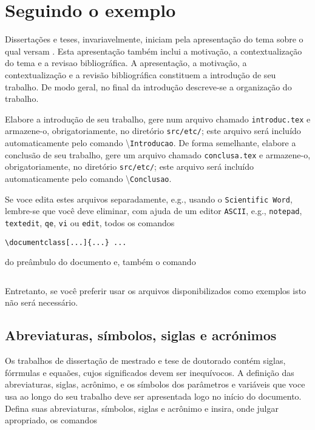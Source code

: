 
\chapter{Seguindo o exemplo\label{cap2}}

Dissertações e teses, invariavelmente, iniciam pela
apresentação do tema sobre o qual versam \cite{SP}. Esta
apresentação também inclui a motivação, a
contextualização do tema e a revisao bibliográfica. A
apresentação, a motivação, a contextualização e a
revisão bibliográfica constituem a introdução de seu trabalho.
De modo geral, no final da introdução descreve-se a
organização do trabalho.

Elabore a introdução de seu trabalho, gere num
arquivo chamado \texttt{introduc.tex} e armazene-o, obrigatoriamente, no diretório \texttt{src/etc/}; este arquivo será incluído automaticamente pelo comando \textbackslash\texttt{Introducao}. De forma semelhante, elabore a conclusão de seu trabalho, gere um arquivo chamado \texttt{conclusa.tex} e armazene-o, obrigatoriamente, no diretório \texttt{src/etc/}; este arquivo será incluído automaticamente pelo comando \textbackslash\texttt{Conclusao}. 

Se voce edita estes arquivos separadamente, e.g., usando o \texttt{Scientific Word}, lembre-se que você deve eliminar, com ajuda de um editor \texttt{ASCII},
e.g., \texttt{notepad}, \texttt{textedit}, \texttt{qe}, \texttt{vi} ou \texttt{edit}, todos os comandos
\begin{verbatim}
\documentclass[...]{...} ... 
\end{verbatim}
\noindent do preâmbulo do documento e, também o comando
\begin{verbatim}

\end{verbatim}

Entretanto, se você preferir usar os arquivos disponibilizados como exemplos isto não será necessário.

\section{Abreviaturas, símbolos, siglas e acrónimos}

Os trabalhos de dissertação de mestrado e tese de doutorado contém
siglas, fórrmulas e equaões, cujos significados devem ser
inequívocos. A definição das abreviaturas, siglas, acrônimo, e os símbolos dos parâmetros e variáveis que voce usa ao longo do seu trabalho deve ser apresentada logo
no início do documento. Defina suas abreviaturas, símbolos, siglas e acrônimo e
insira, onde julgar apropriado, os comandos

